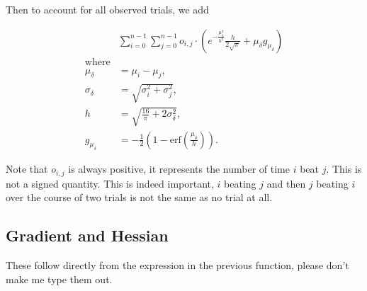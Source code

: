\documentclass[12pt]{article}
\begin{document}
Then to account for all observed trials, we add

\begin{align*}
    &\sum_{i=0}^{n-1} \sum_{j=0}^{n-1} o_{i,j} \cdot \left( e^{-\frac{\mu_{\delta}^2}{h^2}} \frac{h}{2\sqrt{\pi}} + \mu_{\delta} g_{\mu_\delta} \right) \\
    \text{where} \\
    \mu_{\delta} &= \mu_i - \mu_j, \\
    \sigma_{\delta} &= \sqrt{\sigma_i^2 + \sigma_j^2}, \\
    h &= \sqrt{\frac{16}{\pi} + 2\sigma_{\delta}^2}, \\
    g_{\mu_\delta} &= -\frac{1}{2} \left( 1 - \text{erf}\left(\frac{\mu_{\delta}}{h}\right) \right).
\end{align*}

Note that $o_{i,j}$ is always positive, it represents the number of time $i$ beat $j$. This is not a signed quantity.
This is indeed important, $i$ beating $j$ and then $j$ beating $i$ over the course of two trials is not the same as no trial at all.


\subsection{Gradient and Hessian}

These follow directly from the expression in the previous function, please don't make me type them out.


\printbibliography
\end{document}
